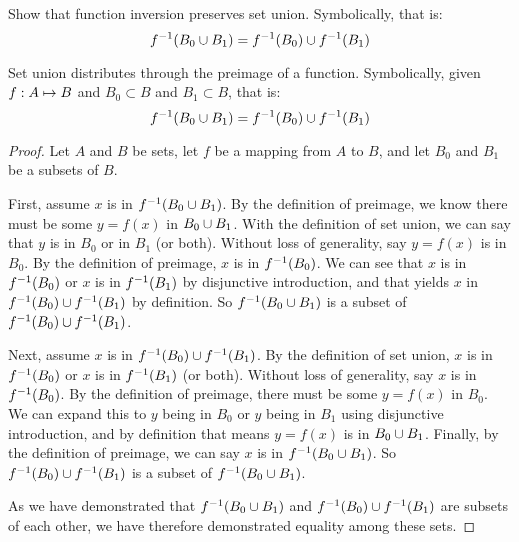 \documentclass[main.tex]{subfiles}
\begin{document}
\subproblem{}\label{s2p2b}

Show that function inversion preserves set union. Symbolically, that is:
\[{f}^{-1}(B_0 \cup B_1) = {f}^{-1}(B_0) \cup {f}^{-1}(B_1)\]

\begin{thm}
	Set union distributes through the preimage of a function. Symbolically,
	given \({f}: {A} \mapsto{} {B}\) and \(B_0 \subset B\) and \(B_1 \subset B\),
	that is:
	\[{f}^{-1}(B_0 \cup B_1) = {f}^{-1}(B_0) \cup {f}^{-1}(B_1)\]
\end{thm}
\begin{proof}
	Let \(A\) and \(B\) be sets, let \(f\) be a mapping from \(A\) to \(B\),
	and let \(B_0\) and \(B_1\) be a subsets of \(B\).

	First, assume \(x\) is in \({f}^{-1}(B_0 \cup B_1)\). By the
	definition of preimage, we know there must be some \(y = f(x)\) in
	\(B_0 \cup B_1\). With the definition of set union, we can say that
	\(y\) is in \(B_0\) or in \(B_1\) (or both). Without loss of generality,
	say \(y = f(x)\) is in \(B_0\). By the definition of preimage, \(x\) is
	in \({f}^{-1}(B_0)\). We can see that \(x\) is in
	\({f}^{-1}(B_0)\) or \(x\) is in \({f}^{-1}(B_1)\) by disjunctive
	introduction, and that yields \(x\) in
	\({f}^{-1}(B_0) \cup {f}^{-1}(B_1)\) by definition. So
	\({f}^{-1}(B_0 \cup B_1)\) is a subset of
	\({f}^{-1}(B_0) \cup {f}^{-1}(B_1)\).

	Next, assume \(x\) is in \({f}^{-1}(B_0) \cup {f}^{-1}(B_1)\).
	By the definition of set union, \(x\) is in \({f}^{-1}(B_0)\) or
	\(x\) is in \({f}^{-1}(B_1)\) (or both). Without loss of generality,
	say \(x\) is in \({f}^{-1}(B_0)\). By the definition of preimage,
	there must be some \(y = f(x)\) in \(B_0\). We can expand this to \(y\)
	being in \(B_0\) or \(y\) being in \(B_1\) using disjunctive
	introduction, and by definition that means \(y = f(x)\) is in
	\(B_0 \cup B_1\). Finally, by the definition of preimage, we can say
	\(x\) is in \({f}^{-1}(B_0 \cup B_1)\). So
	\({f}^{-1}(B_0) \cup {f}^{-1}(B_1)\) is a subset of
	\({f}^{-1}(B_0 \cup B_1)\).

	As we have demonstrated that \({f}^{-1}(B_0 \cup B_1)\) and
	\({f}^{-1}(B_0) \cup {f}^{-1}(B_1)\) are subsets of each other,
	we have therefore demonstrated equality among these sets.
\end{proof}
\end{document}
